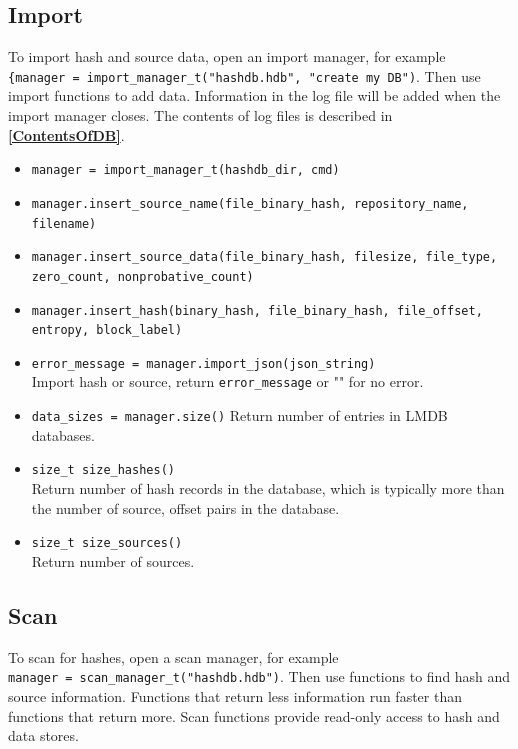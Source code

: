 \documentclass[11pt,fleqn]{article} %
\begin{document}
\subsection{Import}
To import hash and source data, open an import manager, for example\\
\verb+{manager = import_manager_t("hashdb.hdb", "create my DB")+. Then use import functions to add data. Information in the log file will be added when the import manager closes. The contents of log files is described in \textbf{\autoref{ContentsOfDB}}.\\
\begin{itemize}
\item \verb+manager = import_manager_t(hashdb_dir, cmd)+
\item \verb+manager.insert_source_name(file_binary_hash, repository_name, filename)+
\item \verb+manager.insert_source_data(file_binary_hash, filesize, file_type,+\\
\verb+zero_count, nonprobative_count)+
\item \verb+manager.insert_hash(binary_hash, file_binary_hash, file_offset,+\\
\verb+entropy, block_label)+
\item \verb+error_message = manager.import_json(json_string)+\\
Import hash or source, return \verb+error_message+ or "" for no error.
\item \verb+data_sizes = manager.size()+
Return number of entries in LMDB databases.
\item \verb+size_t size_hashes()+\\
Return number of hash records in the database, which is typically more than the number of source, offset pairs in the database.
\item \verb+size_t size_sources()+\\
Return number of sources.
\end{itemize}

\subsection{Scan}
To scan for hashes, open a scan manager, for example\\
\verb+manager = scan_manager_t("hashdb.hdb")+. Then use functions to find hash and source information. Functions that return less information run faster than functions that return more. Scan functions provide read-only access to hash and data stores.
\end{document}
